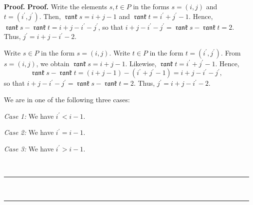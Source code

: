 \documentclass[numbers=enddot,12pt,final,onecolumn,notitlepage]{scrartcl}%
\theoremstyle{definition}
\newenvironment{verlong}{}{}
\newenvironment{vershort}{}{}
\DeclareMathOperator{\rank}{\mathfrak{rank}}
\newenvironment{proof}[1][Proof]{\noindent\textbf{#1.} }{\ \rule{0.5em}{0.5em}}
\begin{document}
\begin{proof}
\begin{proof}
\begin{vershort}
Write the elements $s,t\in P$ in the forms $s=\left(  i,j\right)  $ and
$t=\left(  i^{\prime},j^{\prime}\right)  $. Then, $\rank s=i+j-1$ and $\rank
t=i^{\prime}+j^{\prime}-1$. Hence, $\rank s-\rank t=i+j-i^{\prime}-j^{\prime}%
$, so that $i+j-i^{\prime}-j^{\prime}=\rank s-\rank t=2$. Thus, $j^{\prime
}=i+j-i^{\prime}-2$.
\end{vershort}

\begin{verlong}
Write $s\in P$ in the form $s=\left(  i,j\right)  $. Write $t\in P$ in the
form $t=\left(  i^{\prime},j^{\prime}\right)  $. From $s=\left(  i,j\right)
$, we obtain $\rank s=i+j-1$. Likewise, $\rank t=i^{\prime}+j^{\prime}-1$.
Hence,%
\[
\rank s-\rank t=\left(  i+j-1\right)  -\left(  i^{\prime}+j^{\prime}-1\right)
=i+j-i^{\prime}-j^{\prime},
\]
so that $i+j-i^{\prime}-j^{\prime}=\rank s-\rank t=2$. Thus, $j^{\prime
}=i+j-i^{\prime}-2$.
\end{verlong}

We are in one of the following three cases:

\textit{Case 1:} We have $i^{\prime}<i-1$.

\textit{Case 2:} We have $i^{\prime}=i-1$.

\textit{Case 3:} We have $i^{\prime}>i-1$.


\end{proof}
\end{proof}
\end{document}
